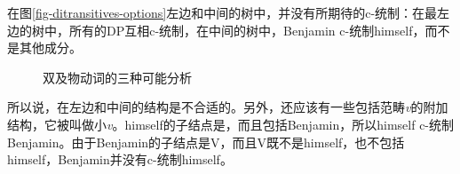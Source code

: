 在图\vref{fig-ditransitives-options}左边和中间的树中，并没有所期待的c-统制：在最左边的树中，所有的DP互相c-统制，在中间的树中，Benjamin c-统制himself，而不是其他成分。
\begin{figure}
\hfill
{}
\hfill
{}
\caption{\label{fig-ditransitives-options}双及物动词的三种可能分析}
\end{figure}%
所以说，在左边和中间的结构是不合适的。另外，还应该有一些包括范畴\textit{v}的附加结构，它被叫做小\emph{v}\citep[4.4]{Adger2003a}。himself的子结点是\vbarc，而且\vbarc 包括Benjamin，所以himself c-统制Benjamin。由于Benjamin的子结点是V，而且V既不是himself，也不包括himself，Benjamin并没有c-统制himself。

